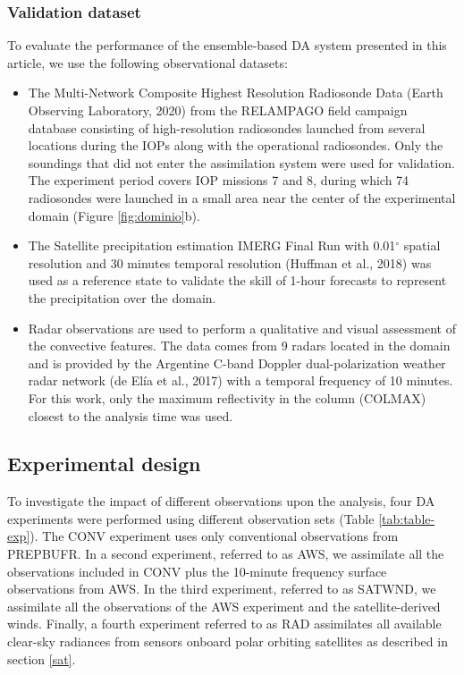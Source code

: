 \documentclass[authoryear,preprint,review,12pt]{elsarticle} %
\begin{document}
\hypertarget{validation-dataset}{%
\subsubsection{Validation dataset}\label{validation-dataset}}

To evaluate the performance of the ensemble-based DA system presented in this article, we use the following observational datasets:

\begin{itemize}
\item
  The Multi-Network Composite Highest Resolution Radiosonde Data (Earth Observing Laboratory, 2020) from the RELAMPAGO field campaign database consisting of high-resolution radiosondes launched from several locations during the IOPs along with the operational radiosondes. Only the soundings that did not enter the assimilation system were used for validation. The experiment period covers IOP missions 7 and 8, during which 74 radiosondes were launched in a small area near the center of the experimental domain (Figure \ref{fig:dominio}b).
\item
  The Satellite precipitation estimation IMERG Final Run with 0.01\(^{\circ}\) spatial resolution and 30 minutes temporal resolution (Huffman et al., 2018) was used as a reference state to validate the skill of 1-hour forecasts to represent the precipitation over the domain.
\item
  Radar observations are used to perform a qualitative and visual assessment of the convective features. The data comes from 9 radars located in the domain and is provided by the Argentine C-band Doppler dual-polarization weather radar network (de Elía et al., 2017) with a temporal frequency of 10 minutes. For this work, only the maximum reflectivity in the column (COLMAX) closest to the analysis time was used.
\end{itemize}

\hypertarget{exp}{%
\subsection{Experimental design}\label{exp}}

To investigate the impact of different observations upon the analysis, four DA experiments were performed using different observation sets (Table \ref{tab:table-exp}). The CONV experiment uses only conventional observations from PREPBUFR. In a second experiment, referred to as AWS, we assimilate all the observations included in CONV plus the 10-minute frequency surface observations from AWS. In the third experiment, referred to as SATWND, we assimilate all the observations of the AWS experiment and the satellite-derived winds. Finally, a fourth experiment referred to as RAD assimilates all available clear-sky radiances from sensors onboard polar orbiting satellites as described in section \ref{sat}.
\end{document}
